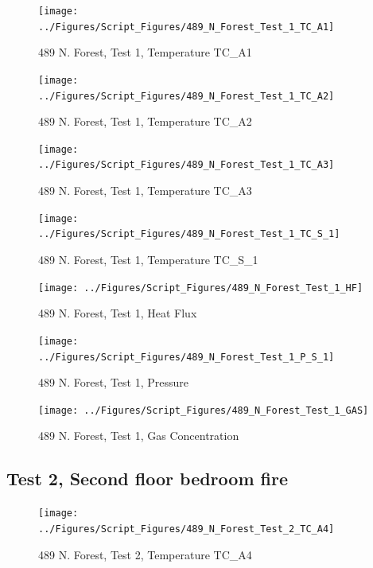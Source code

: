 \documentclass[12pt,oneside]{book}
\begin{document}
\begin{figure}[!ht]
\texttt{[image: ../Figures/Script\_Figures/489\_N\_Forest\_Test\_1\_TC\_A1]}
\caption{489 N. Forest, Test 1, Temperature TC\_A1}
\label{fig:489_N_Forest_Test_1_TC_A1}
\end{figure}

\begin{figure}[!ht]
\texttt{[image: ../Figures/Script\_Figures/489\_N\_Forest\_Test\_1\_TC\_A2]}
\caption{489 N. Forest, Test 1, Temperature TC\_A2}
\label{fig:489_N_Forest_Test_1_TC_A2}
\end{figure}

\begin{figure}[!ht]
\texttt{[image: ../Figures/Script\_Figures/489\_N\_Forest\_Test\_1\_TC\_A3]}
\caption{489 N. Forest, Test 1, Temperature TC\_A3}
\label{fig:489_N_Forest_Test_1_TC_A3}
\end{figure}

\begin{figure}[!ht]
\texttt{[image: ../Figures/Script\_Figures/489\_N\_Forest\_Test\_1\_TC\_S\_1]}
\caption{489 N. Forest, Test 1, Temperature TC\_S\_1}
\label{fig:489_N_Forest_Test_1_TC_S_1}
\end{figure}

\begin{figure}[!ht]
\texttt{[image: ../Figures/Script\_Figures/489\_N\_Forest\_Test\_1\_HF]}
\caption{489 N. Forest, Test 1, Heat Flux}
\label{fig:489_N_Forest_Test_1_HF}
\end{figure}

\begin{figure}[!ht]
\texttt{[image: ../Figures/Script\_Figures/489\_N\_Forest\_Test\_1\_P\_S\_1]}
\caption{489 N. Forest, Test 1, Pressure}
\label{fig:489_N_Forest_Test_1_P_S_1}
\end{figure}

\begin{figure}[!ht]
\texttt{[image: ../Figures/Script\_Figures/489\_N\_Forest\_Test\_1\_GAS]}
\caption{489 N. Forest, Test 1, Gas Concentration}
\label{fig:489_N_Forest_Test_1_GAS}
\end{figure}


\clearpage


\subsection{Test 2, Second floor bedroom fire}

\begin{figure}[!ht]
\texttt{[image: ../Figures/Script\_Figures/489\_N\_Forest\_Test\_2\_TC\_A4]}
\caption{489 N. Forest, Test 2, Temperature TC\_A4}
\label{fig:489_N_Forest_Test_2_TC_A4}
\end{figure}
\end{document}
